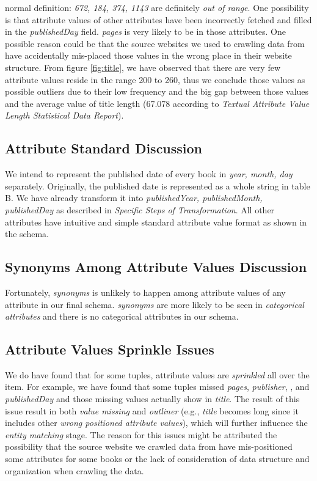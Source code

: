 \documentclass[10pt, oneside]{article}
\begin{document}
normal definition: \textit{672, 184, 374, 1143} are definitely \textit{out of range}. One possibility is that attribute values of other attributes have been incorrectly 
fetched and filled in the \textit{publishedDay} field. \textit{pages} is very likely to be in those attributes. One possible reason could be that the source websites
we used to crawling data from have accidentally mis-placed those values in the wrong place in their website structure. From figure \ref{fig:title}, we have observed 
that there are very few attribute values reside in the range 200 to 260, thus we conclude those values as possible outliers due to their low frequency and the big 
gap between those values and the average value of title length (67.078 according to \textit{Textual Attribute Value Length Statistical Data Report}).

\subsection*{Attribute Standard Discussion}
We intend to represent the published date of every book in \textit{year, month, day} separately. Originally, the published date is represented as a whole string in 
table B. We have already transform it into \textit{publishedYear, publishedMonth, publishedDay} as described in \textit{Specific Steps of Transformation}. All other 
attributes have intuitive and simple standard attribute value format as shown in the schema.
\subsection*{Synonyms Among Attribute Values Discussion}
Fortunately, \textit{synonyms} is unlikely to happen among attribute values of any attribute in our final schema. \textit{synonyms} are more likely to be seen in 
\textit{categorical attributes} and there is no categorical attributes in our schema.

\subsection*{Attribute Values Sprinkle Issues}
We do have found that for some tuples, attribute values are \textit{sprinkled} all over the item. For example, we have found that some tuples missed \textit{pages},
\textit{publisher}, ,  and \textit{publishedDay} and those missing values actually show in \textit{title}. The result of this issue
result in both \textit{value missing} and \textit{outliner} (e.g., \textit{title} becomes long since it includes other \textit{wrong positioned attribute values}), which will 
further influence the \textit{entity matching} stage. The reason for this issues might be attributed the possibility that the source website we crawled data from have 
mis-positioned some attributes for some books or the lack of consideration of data structure and organization when crawling the data.
\end{document}
